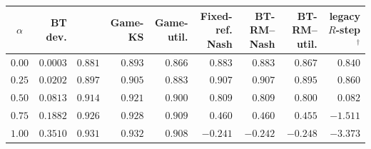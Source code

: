 \begin{tabular}{crrrrrrrr}
\toprule
$\alpha$ & BT dev. & \NBPO{} & Game-KS & Game-util. & Fixed-ref. Nash & BT-RM--Nash & BT-RM--util. & legacy $R$-step$^\dagger$\\
\midrule
$0.00$ & $0.0003$ & $0.881$ & $0.893$ & $0.866$ & $0.883$ & $0.883$ & $0.867$ & $0.840$\\
$0.25$ & $0.0202$ & $0.897$ & $0.905$ & $0.883$ & $0.907$ & $0.907$ & $0.895$ & $0.860$\\
$0.50$ & $0.0813$ & $0.914$ & $0.921$ & $0.900$ & $0.809$ & $0.809$ & $0.800$ & $0.082$\\
$0.75$ & $0.1882$ & $0.926$ & $0.928$ & $0.909$ & $0.460$ & $0.460$ & $0.455$ & $-1.511$\\
$1.00$ & $0.3510$ & $0.931$ & $0.932$ & $0.908$ & $-0.241$ & $-0.242$ & $-0.248$ & $-3.373$\\
\bottomrule
\end{tabular}
